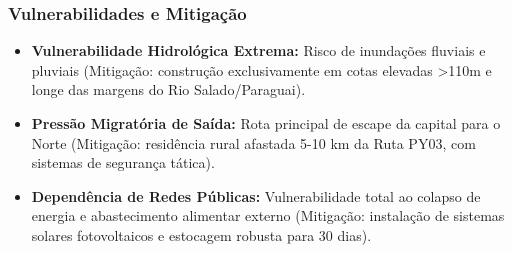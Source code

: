 \subsubsection{Vulnerabilidades e
Mitigação}

\begin{itemize}
\tightlist
\item
  \textbf{Vulnerabilidade Hidrológica Extrema:} Risco de inundações
  fluviais e pluviais (Mitigação: construção exclusivamente em cotas
  elevadas \textgreater110m e longe das margens do Rio Salado/\allowbreak Paraguai).
\item
  \textbf{Pressão Migratória de Saída:} Rota principal de escape da
  capital para o Norte (Mitigação: residência rural afastada 5-10 km da
  Ruta PY03, com sistemas de segurança tática).
\item
  \textbf{Dependência de Redes Públicas:} Vulnerabilidade total ao
  colapso de energia e abastecimento alimentar externo (Mitigação:
  instalação de sistemas solares fotovoltaicos e estocagem robusta para
  30 dias).
\end{itemize}

